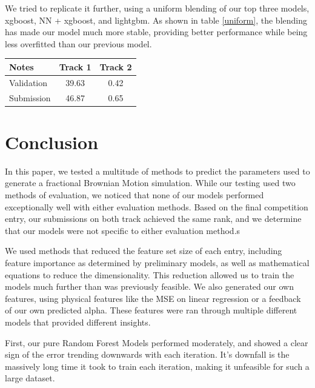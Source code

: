 \documentclass[a4paper, 12pt]{article}
\begin{document}
\begin{multicols}{2}
                We tried to replicate it further, using a uniform blending of our top three models, xgboost, NN + xgboost, and lightgbm. As shown in table \ref {uniform}, the blending has made our model much more stable, providing better performance while being less overfitted than our previous model.
                \begin{center}
                    \begin{tabular}{l|cc}
                        Notes & Track 1 & Track 2 \\
                        \hline
                        Validation & 39.63 & 0.42 \\
                        Submission & 46.87 & 0.65
                    \end{tabular}
                    \label{uniform}
                \end{center}
            \end{multicols}
        \section{Conclusion}
                In this paper, we tested a multitude of methods to predict the parameters used to generate a fractional Brownian Motion simulation. While our testing used two methods of evaluation, we noticed that none of our models performed exceptionally well with either evaluation methods. Based on the final competition entry, our submissions on both track achieved the same rank, and we determine that our models were not specific to either evaluation method.s
                
                We used methods that reduced the feature set size of each entry, including feature importance as determined by preliminary models, as well as mathematical equations to reduce the dimensionality. This reduction allowed us to train the models much further than was previously feasible. We also generated our own features, using physical features like the MSE on linear regression or a feedback of our own predicted alpha. These features were ran through multiple different models that provided different insights.
                
                First, our pure Random Forest Models performed moderately, and showed a clear sign of the error trending downwards with each iteration. It's downfall is the massively long time it took to train each iteration, making it unfeasible for such a large dataset. 
                
\end{document}
